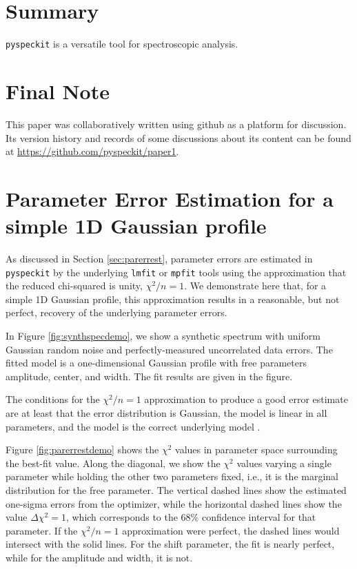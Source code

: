 \documentclass[twocolumn]{aastex62}
\newcommand{\pyspeckit}{\texttt{pyspeckit}\xspace}
\begin{document}
\section{Summary}
\texttt{pyspeckit} is a versatile tool for spectroscopic analysis.

\section{Final Note}
This paper was collaboratively written using github as a platform for
discussion.  Its version history and records of some discussions about its
content can be found at \url{https://github.com/pyspeckit/paper1}.




\appendix
\section{Parameter Error Estimation for a simple 1D Gaussian profile}
\label{appendix:parerrest}
As discussed in Section \ref{sec:parerrest}, parameter errors are estimated in
\pyspeckit by the underlying \texttt{lmfit} or \texttt{mpfit} tools using the
approximation that the reduced chi-squared is unity, $\chi^2/n=1$.  We
demonstrate here that, for a simple 1D Gaussian profile, this approximation
results in a reasonable, but not perfect, recovery of the underlying parameter
errors.

In Figure \ref{fig:synthspecdemo}, we show a synthetic spectrum with uniform
Gaussian random noise and perfectly-measured uncorrelated data errors.
The fitted model is a one-dimensional Gaussian profile with free parameters
amplitude, center, and width.  The fit results are given in the figure.

The conditions for the $\chi^2/n=1$ approximation to produce a good error
estimate are at least that the error distribution is Gaussian, the model is
linear in all parameters, and the model is the correct underlying model
\citep{Andrae2010b}.

Figure \ref{fig:parerrestdemo} shows the $\chi^2$ values in parameter space
surrounding the best-fit value.  Along the diagonal, we show the $\chi^2$
values varying a single parameter while holding the other two parameters fixed,
i.e., it is the marginal distribution for the free parameter.  The vertical
dashed lines show the estimated one-sigma errors from the optimizer, while the
horizontal dashed lines show the value $\Delta\chi^2=1$, which corresponds to
the 68\% confidence interval for that parameter.  If the $\chi^2/n=1$
approximation were perfect, the dashed lines would intersect with the solid
lines.  For the shift parameter, the fit is nearly perfect, while for the
amplitude and width, it is not.
\end{document}
